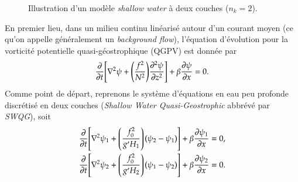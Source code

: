 \documentclass[10pt]{article}
\numberwithin{equation}{section}
\newcommand{\pt}{\hspace{1pt}}
\begin{document}
\begin{figure}
\begin{center}
\vspace{-\baselineskip}
\end{center}
\caption{\label{org162d1ae}Illustration d'un modèle \textit{shallow water} à deux couches (\(n_k = 2\)).}
\end{figure}

En premier lieu, dans un milieu continu linéarisé autour d'un courant moyen (ce qu'on appelle généralement un \emph{background flow}), l'équation d'évolution pour la vorticité potentielle quasi-géostrophique (QGPV) est donnée par
\begin{equation}
\label{eq:org65f42fd}
   \pdv{}{t} \qty[\laplacian\psi + \qty(\frac{f^2}{N^2})\pdv[2]{\psi}{z}] + \beta \pdv{\psi}{x} = 0.
\end{equation}
Comme point de départ, reprenons le système d'équations en eau peu profonde discrétisé en deux couches (\emph{Shallow Water Quasi-Geostrophic} abbrévé par \emph{SWQG}), soit
\begin{subequations}
\label{eq:orga00089f}
\begin{align}
   &\pdv{}{t} \qty[\laplacian\psi_1 + \qty(\frac{f_0^2}{g'H_1}) \pt(\psi_2 - \psi_1)] + \beta \pdv{\psi_1}{x} = 0,\\
   &\pdv{}{t} \qty[\laplacian\psi_2 + \qty(\frac{f_0^2}{g'H_2}) \pt(\psi_1 - \psi_2)] + \beta \pdv{\psi_2}{x} = 0.
\end{align}
\end{subequations}
\end{document}
